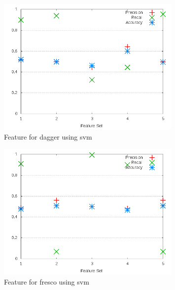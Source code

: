 \begin{figure}[!h]
    \centering
        \includegraphics[width=0.8\textwidth]{images/svm/test_3/dagger_sample_range}
        \caption{Feature for dagger using \gls{svm}}
        \label{fig:test_3_dagger_svm}
\end{figure}



\begin{figure}[!h]
    \centering
        \includegraphics[width=0.8\textwidth]{images/svm/test_3/fresco_sample_range}
        \caption{Feature for fresco using \gls{svm}}
        \label{fig:test_3_fresco_svm}
\end{figure}

